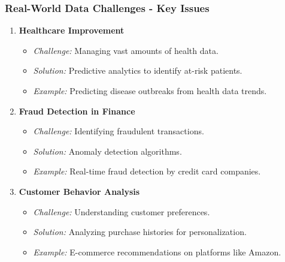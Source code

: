 \documentclass[aspectratio=169]{beamer}
\begin{document}
\begin{frame}[fragile]
    \frametitle{Real-World Data Challenges - Key Issues}
    \begin{enumerate}
        \item \textbf{Healthcare Improvement}
            \begin{itemize}
                \item \textit{Challenge:} Managing vast amounts of health data.
                \item \textit{Solution:} Predictive analytics to identify at-risk patients.
                \item \textit{Example:} Predicting disease outbreaks from health data trends.
            \end{itemize}
        
        \item \textbf{Fraud Detection in Finance}
            \begin{itemize}
                \item \textit{Challenge:} Identifying fraudulent transactions.
                \item \textit{Solution:} Anomaly detection algorithms.
                \item \textit{Example:} Real-time fraud detection by credit card companies.
            \end{itemize}
        
        \item \textbf{Customer Behavior Analysis}
            \begin{itemize}
                \item \textit{Challenge:} Understanding customer preferences.
                \item \textit{Solution:} Analyzing purchase histories for personalization.
                \item \textit{Example:} E-commerce recommendations on platforms like Amazon.
            \end{itemize}
    \end{enumerate}
\end{frame}
\end{document}

